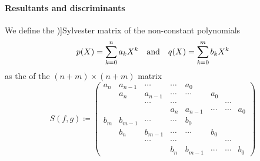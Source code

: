 \paragraph{Resultants and discriminants}

\begin{definition}\label{def:sylvester_matrix}
  We define the \term[ru=матрица Сильвестра, en=Sylvester matrix (\cite[def. 3.6.2]{CoxLittleOShea2015AlgGeometry})]{Sylvester matrix} of the non-constant polynomials
  \begin{align*}
    p(X) = \sum_{k=0}^n a_k X^k
    &&\T{and}&&
    q(X) = \sum_{k=0}^m b_k X^k
  \end{align*}
  as the  of the \( (n + m) \times (n + m) \) matrix
  \begin{equation*}
    S(f, g) \coloneqq
    \begin{pmatrix}
      a_n    & a_{n-1} & \cdots  & \cdots  & a_0     &        &        &        \\
             & a_n     & a_{n-1} & \cdots  & \cdots  & a_0    &        &        \\
             &         & \cdots  & \cdots  &         &        & \cdots &        \\
             &         &         & a_n     & a_{n-1} & \cdots & \cdots & a_0    \\
      b_m    & b_{m-1} & \cdots  & \cdots  & b_0     &        &        &        \\
             & b_n     & b_{m-1} & \cdots  & \cdots  & b_0    &        &        \\
             &         & \cdots  & \cdots  &         &        & \cdots &        \\
             &         &         & b_n     & b_{m-1} & \cdots & \cdots & b_0
    \end{pmatrix}
  \end{equation*}
\end{definition}

